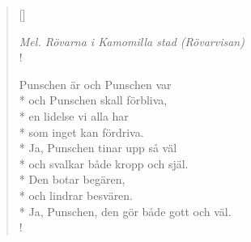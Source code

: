 \settowidth{\versewidth}{som inget kan fördriva.}


\begin{verse}[\versewidth]

\flagverse{}
\emph{Mel. Rövarna i Kamomilla stad (Rövarvisan)}\\!

Punschen är och Punschen var\\*
och Punschen skall förbliva,\\*
en lidelse vi alla har\\*
som inget kan fördriva.\\*
Ja, Punschen tinar upp så väl\\*
och svalkar både kropp och själ.\\*
Den botar begären,\\*
och lindrar besvären.\\*
Ja, Punschen, den gör både gott och väl.\\!




\end{verse}

